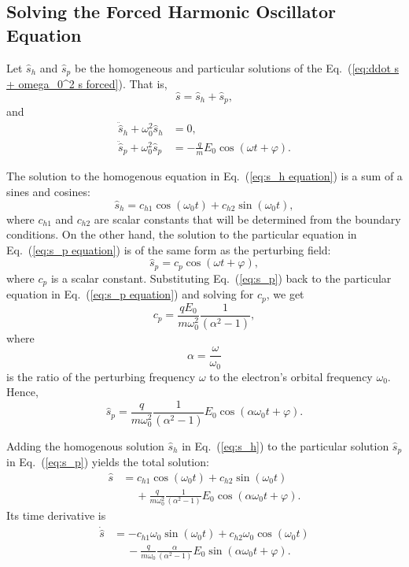 \documentclass[twocolumn,showpacs,preprintnumbers,amsmath,amssymb]{revtex4}
\begin{document}
\subsection{Solving the Forced Harmonic Oscillator Equation}

Let $\hat s_h$ and $\hat s_p$ be the homogeneous and particular solutions of the Eq.~(\ref{eq:ddot s + omega_0^2 s forced}).  That is,
\begin{equation}
\hat s = \hat s_h + \hat s_p,
\end{equation}
and
\begin{align}
\label{eq:s_h equation}
\ddot{\hat{s}}_h + \omega_0^2 \hat s_h &= 0,\\
\label{eq:s_p equation}
\ddot{\hat{s}}_p + \omega_0^2 \hat s_p &= -\frac{q}{m}E_0\cos(\omega t + \varphi).
\end{align}	 

The solution to the homogenous equation in Eq.~(\ref{eq:s_h equation}) is a sum of a sines and cosines:
\begin{equation}
\label{eq:s_h}
\hat s_h = c_{h1}\cos(\omega_0 t) + c_{h2}\sin(\omega_0 t),
\end{equation}
where $c_{h1}$ and $c_{h2}$ are scalar constants that will be determined from the boundary conditions.  On the other hand, the solution to the particular equation in Eq.~(\ref{eq:s_p equation}) is of the same form as the perturbing field:
\begin{equation}
\label{eq:s_p}
\hat s_p = c_p\cos(\omega t + \varphi),
\end{equation}
where $c_p$ is a scalar constant.  Substituting Eq.~(\ref{eq:s_p}) back to the particular equation in Eq.~(\ref{eq:s_p equation}) and solving for $c_p$, we get
\begin{equation}
c_p = \frac{qE_0}{m\omega_0^2}\frac{1}{(\alpha^2 - 1)},
\end{equation}
where
\begin{equation}
\alpha =\frac{\omega}{\omega_0}
\end{equation}
is the ratio of the perturbing frequency $\omega$ to the electron's orbital frequency $\omega_0$. Hence,
\begin{equation}
\hat s_p = \frac{q}{m\omega_0^2}\frac{1}{(\alpha^2 - 1)}E_0\cos(\alpha\omega_0 t + \varphi).
\end{equation}

Adding the homogenous solution $\hat s_h$ in Eq.~(\ref{eq:s_h}) to the particular solution $\hat s_p$ in Eq.~(\ref{eq:s_p}) yields the total solution:
\begin{align}
\label{eq:s expand}
\hat s &= c_{h1}\cos(\omega_0 t) + c_{h2}\sin(\omega_0 t) \nonumber \\
& \quad \ + \frac{q}{m\omega_0^2}\frac{1}{(\alpha^2 - 1)}E_0\cos(\alpha\omega_0 t + \varphi).
\end{align}
Its time derivative is
\begin{align}
\label{eq:dot s expand}
\dot{\hat s} &= -c_{h1}\omega_0\sin(\omega_0 t) + c_{h2}\omega_0\cos(\omega_0 t) \nonumber \\
&\quad \  - \frac{q}{m\omega_0}\frac{\alpha}{(\alpha^2 - 1)}E_0\sin(\alpha\omega_0 t + \varphi).
\end{align}
\end{document}
